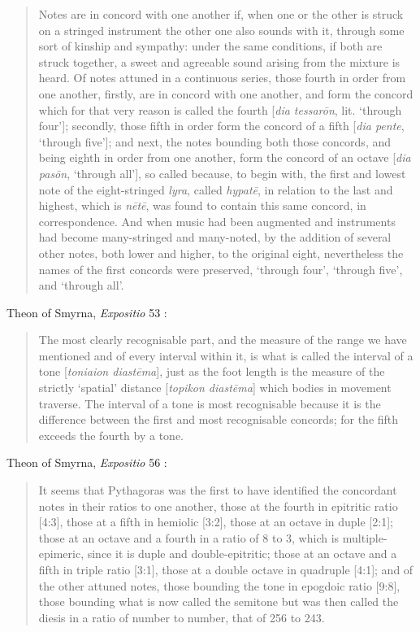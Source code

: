\documentclass{amsart}
\theoremstyle{definition}
\begin{document}
\begin{quote}
Notes are in concord with one another if, when one or the other is struck on
a stringed instrument the other one also sounds with it, through some sort of
kinship and sympathy: under the same conditions, if both are struck together,
a sweet and agreeable sound arising from the mixture is heard. Of notes
attuned in a continuous series, those fourth in order from one another, firstly,
are in concord with one another, and form the concord which for that very
reason is called the fourth [{\em dia tessar\={o}n}, lit. `through four']; secondly, those
fifth in order form the concord of a fifth [{\em dia pente}, `through five']; and next,
the notes bounding both those concords, and being eighth in order from one
another, form the concord of an octave [{\em dia pas\={o}n}, `through all'], so called
because, to begin with, the first and lowest note of the eight-stringed {\em lyra}, called
{\em hypat\={e}}, in relation to the last and highest, which is {\em n\={e}t\={e}}, was found to contain
this same concord, in correspondence. And when music had been augmented
and instruments had become many-stringed and many-noted, by the addition
of several other notes, both lower and higher, to the original eight, nevertheless
the names of the first concords were preserved, `through four', `through five',
and `through all'.
\end{quote}

Theon of Smyrna, {\em Expositio} 53 \cite[p.~215]{barker}:

\begin{quote}
The most clearly recognisable part, and the measure of the range we have
mentioned and of every interval within it, is what is called the interval of a tone
[{\em toniaion diast\={e}ma}], just as the foot length is the measure of the strictly
`spatial' distance [{\em topikon diast\={e}ma}] which bodies in movement traverse. The
interval of a tone is most recognisable because it is the difference between the
first and most recognisable concords; for the fifth exceeds the fourth by a
tone.
\end{quote}

Theon of Smyrna, {\em Expositio} 56 \cite[p.~217]{barker}:

\begin{quote}
It seems that Pythagoras was the first to have identified the concordant
notes in their ratios to one another, those at the fourth in epitritic ratio [4:3],
those at a fifth in hemiolic [3:2], those at an octave in duple [2:1]; those at an
octave and a fourth in a ratio of 8 to 3, which is multiple-epimeric, since it is
duple and double-epitritic; those at an octave and a fifth in triple ratio [3:1],
those at a double octave in quadruple [4:1]; and of the other attuned notes,
those bounding the tone in epogdoic ratio [9:8], those bounding what is now
called the semitone but was then called the diesis in a ratio of number to
number, that of 256 to 243.
\end{quote}
\end{document}
